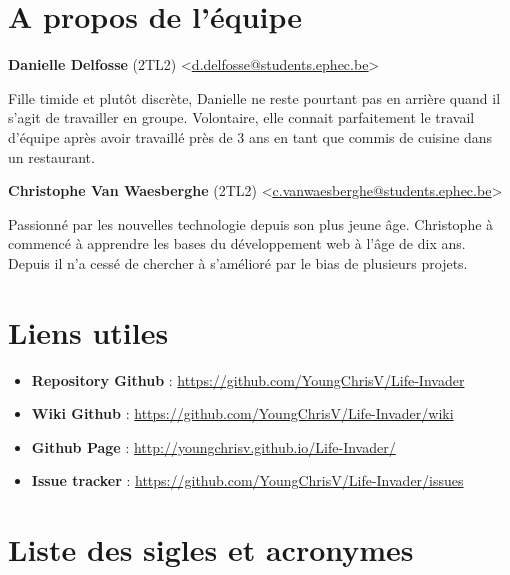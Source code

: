 \documentclass[a4paper,12pt, oneside]{book}
\theoremstyle{break}
\begin{document}

\frontmatter

\chapter*{A propos de l'équipe}



\textbf{Danielle Delfosse} (2TL2)  <\underline{\href{mailto:d.delfosse@students.ephec.be}{d.delfosse@students.ephec.be}}>

Fille timide et plutôt discrète, Danielle ne reste pourtant pas en arrière quand il s'agit de travailler en groupe. Volontaire, elle connait parfaitement le travail d'équipe après avoir travaillé près de 3 ans en tant que commis de cuisine dans un restaurant. 

\textbf{Christophe Van Waesberghe} (2TL2) <\underline{\href{mailto:c.vanwaesberghe@students.ephec.be}{c.vanwaesberghe@students.ephec.be}}>

Passionné par les nouvelles technologie depuis son plus jeune âge. Christophe à commencé à apprendre les bases du développement web à l'âge de dix ans. Depuis il n'a cessé de chercher à s'amélioré par le bias de plusieurs projets.
\clearpage

\chapter*{Liens utiles}
\begin{itemize}
    \item \textbf{Repository Github} : \url{https://github.com/YoungChrisV/Life-Invader}
    \item \textbf{Wiki Github} : \url{https://github.com/YoungChrisV/Life-Invader/wiki}
    \item \textbf{Github Page} : \url{http://youngchrisv.github.io/Life-Invader/}
    \item \textbf{Issue tracker} : \url{https://github.com/YoungChrisV/Life-Invader/issues}
\end{itemize}

\tableofcontents

\clearpage
\listoffigures

\clearpage
\chapter*{Liste des sigles et acronymes}
\begin{acronym}[CP-OFDMX] %
\end{acronym}
\end{document}
